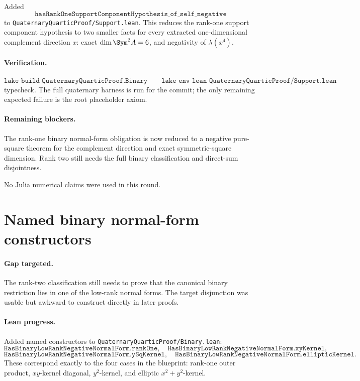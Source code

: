 \documentclass[11pt]{article}
\begin{document}
Added
\[
\texttt{hasRankOneSupportComponentHypothesis\_of\_self\_negative}
\]
to \texttt{QuaternaryQuarticProof/Support.lean}.  This reduces the rank-one
support component hypothesis to two smaller facts for every extracted
one-dimensional complement direction \(x\): exact
\(\dim\Sym^2A=6\), and negativity of \(\lambda(x^4)\).

\paragraph{Verification.}
\[
\texttt{lake build QuaternaryQuarticProof.Binary}
\qquad
\texttt{lake env lean QuaternaryQuarticProof/Support.lean}
\]
typecheck.  The full quaternary harness is run for the commit; the only
remaining expected failure is the root placeholder axiom.

\paragraph{Remaining blockers.}
The rank-one binary normal-form obligation is now reduced to a negative
pure-square theorem for the complement direction and exact symmetric-square
dimension.  Rank two still needs the full binary classification and
direct-sum disjointness.

No Julia numerical claims were used in this round.

\section*{Named binary normal-form constructors}

\paragraph{Gap targeted.}
The rank-two classification still needs to prove that the canonical binary
restriction lies in one of the low-rank normal forms.  The target disjunction
was usable but awkward to construct directly in later proofs.

\paragraph{Lean progress.}
Added named constructors to \texttt{QuaternaryQuarticProof/Binary.lean}:
\[
\texttt{HasBinaryLowRankNegativeNormalForm.rankOne},
\quad
\texttt{HasBinaryLowRankNegativeNormalForm.xyKernel},
\]
\[
\texttt{HasBinaryLowRankNegativeNormalForm.ySqKernel},
\quad
\texttt{HasBinaryLowRankNegativeNormalForm.ellipticKernel}.
\]
These correspond exactly to the four cases in the blueprint: rank-one outer
product, \(xy\)-kernel diagonal, \(y^2\)-kernel, and elliptic
\(x^2+y^2\)-kernel.
\end{document}
